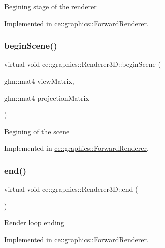 Begining stage of the renderer 

Implemented in \hyperlink{classce_1_1graphics_1_1_forward_renderer_a4550120dc1349b5298de4a02422c6c26}{ce\+::graphics\+::\+Forward\+Renderer}.

\mbox{\label{classce_1_1graphics_1_1_renderer3_d_a308b1b75bf6ac0d73f89ce89840f632a}} 
\subsubsection{\texorpdfstring{begin\+Scene()}{beginScene()}}
{\footnotesize\ttfamily virtual void ce\+::graphics\+::\+Renderer3\+D\+::begin\+Scene (\begin{DoxyParamCaption}\item[{glm\+::mat4}]{view\+Matrix,  }\item[{glm\+::mat4}]{projection\+Matrix }\end{DoxyParamCaption})\hspace{0.3cm}{\ttfamily [pure virtual]}}

Begining of the scene 

Implemented in \hyperlink{classce_1_1graphics_1_1_forward_renderer_a218629cfc8ee0f776589956f12ce9441}{ce\+::graphics\+::\+Forward\+Renderer}.

\mbox{\label{classce_1_1graphics_1_1_renderer3_d_a4d35e07f42a4fb42ebe3f8e57bfcdb58}} 
\subsubsection{\texorpdfstring{end()}{end()}}
{\footnotesize\ttfamily virtual void ce\+::graphics\+::\+Renderer3\+D\+::end (\begin{DoxyParamCaption}{ }\end{DoxyParamCaption})\hspace{0.3cm}{\ttfamily [pure virtual]}}

Render loop ending 

Implemented in \hyperlink{classce_1_1graphics_1_1_forward_renderer_a8a8c16a645e63fd54b932f62d96d805b}{ce\+::graphics\+::\+Forward\+Renderer}.

